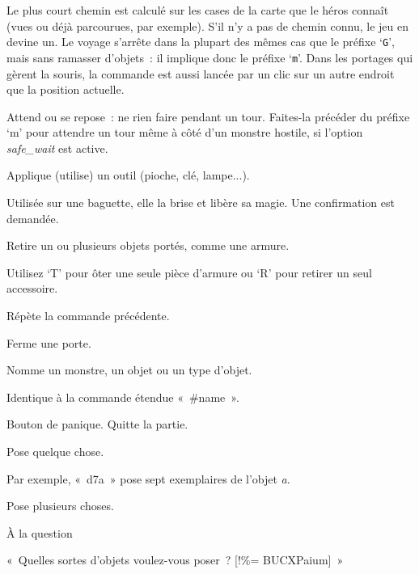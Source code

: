 \documentclass[titlepage]{article}
\begin{document}
\begin{description}
Le plus court chemin est calculé sur les cases de la carte que le héros
connaît (vues ou déjà parcourues, par exemple).
S'il n'y a pas de chemin connu, le jeu en devine un.
Le voyage s'arrête dans la plupart des mêmes cas que le préfixe
`\texttt{G}', mais sans ramasser d'objets~: il implique donc le
préfixe `\texttt{m}'.
Dans les portages qui gèrent la souris, la commande est aussi lancée par un
clic sur un autre endroit que la position actuelle.

\item[{.}]
Attend ou se repose~: ne rien faire pendant un tour.
Faites-la précéder du préfixe `m' pour attendre un tour même à côté
d'un monstre hostile, si l'option
\textit{safe\_wait}
est active.

\item[{a}]
Applique (utilise) un outil (pioche, clé, lampe...).


Utilisée sur une baguette, elle la brise et libère sa magie.
Une confirmation est demandée.

\item[{A}]
Retire un ou plusieurs objets portés, comme une armure.


Utilisez `T' pour ôter une seule pièce d'armure ou `R' pour
retirer un seul accessoire.

\item[{\textasciicircum{}A}]
Répète la commande précédente.

\item[{c}]
Ferme une porte.

\item[{C}]
Nomme un monstre, un objet ou un type d'objet.


Identique à la commande étendue «~\#name~».

\item[{\textasciicircum{}C}]
Bouton de panique.
Quitte la partie.

\item[{d}]
Pose quelque chose.


Par exemple, «~d7a~» pose sept exemplaires de l'objet \textit{a}.

\item[{D}]
Pose plusieurs choses.


À la question


«~Quelles sortes d'objets voulez-vous poser~? [!\%= BUCXPaium]~»



\end{description}
\end{document}
